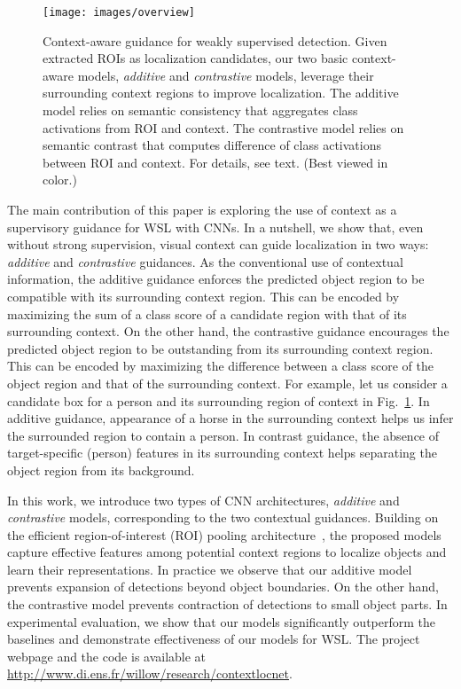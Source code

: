 \documentclass[runningheads]{llncs}
\begin{document}
\begin{figure}[t] 
\texttt{[image: images/overview]} 
\vspace{-6ex} 
\caption[small]{Context-aware guidance for weakly supervised detection.
Given extracted ROIs as localization candidates, our two basic context-aware models, {\em additive} and {\em contrastive} models, leverage their surrounding context regions to improve localization. The additive model relies on semantic consistency that aggregates  class activations from ROI and context. The contrastive model relies on semantic contrast that computes  difference of class activations between ROI and context. For details, see text. (Best viewed in color.)} 
\label{fig:intro} 
\end{figure}%
The main contribution of this paper is exploring the use of context as a
supervisory guidance for WSL with CNNs. In a nutshell, we show that, even without strong
supervision, visual context can guide localization in two ways: {\it additive
} and {\it contrastive} guidances.  As the conventional use of contextual
information, the additive guidance enforces the predicted object region to be
compatible with its surrounding context region. This can be encoded by
maximizing the sum of a class score of a candidate region with that of its
surrounding context.
On the other hand, the contrastive guidance encourages the
predicted object region to be outstanding from its surrounding context region.
This can be encoded by maximizing the difference between a class score of the
object region and that of the surrounding context. %
For example, let us consider a candidate box for a person and its surrounding
region of context in Fig.~\ref{fig:intro}. In additive guidance,
appearance of a horse in the surrounding context helps us infer the
surrounded region to contain a person. In contrast guidance, the absence of
target-specific (person) features in its surrounding context helps 
separating the object region from its background.


In this work, we introduce two types of CNN architectures, {\it additive} and
{\it contrastive} models, corresponding to the two contextual guidances. 
Building on the efficient region-of-interest (ROI) pooling
architecture~\cite{ren15fasterrcnn}, the proposed models capture effective
features among potential context regions to localize objects and learn their
representations.
In practice we observe that our additive model prevents expansion of detections
beyond object boundaries. On the other hand, the contrastive model prevents
contraction of detections to small object parts.
In experimental evaluation, we show that our models
significantly outperform the baselines and demonstrate effectiveness of our models for WSL. The project webpage and the code is available at \url{http://www.di.ens.fr/willow/research/contextlocnet}.
\end{document}
